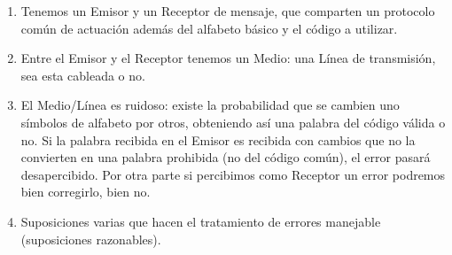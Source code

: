 \begin{enumerate}
\begin{enumerate}
    \begin{enumerate}
    \def\labelenumiii{\arabic{enumiii}.}
    \item
      Tenemos un Emisor y un Receptor de mensaje, que comparten un
      protocolo común de actuación además del alfabeto básico y el
      código a utilizar.
    \item
      Entre el Emisor y el Receptor tenemos un Medio: una Línea de
      transmisión, sea esta cableada o no.
    \item
      El Medio/Línea es ruidoso: existe la probabilidad que se cambien
      uno símbolos de alfabeto por otros, obteniendo así una palabra del
      código válida o no. Si la palabra re\-cibida en el Emisor es
      recibida con cambios que no la convierten en una palabra prohibida
      (no del código común), el error pasará desapercibido. Por otra
      parte si per\-cibimos como Receptor un error podremos bien
      corregirlo, bien no.
    \item
      Suposiciones varias que hacen el tratamiento de errores manejable
      (suposiciones ra\-zonables).


\end{enumerate}
\end{enumerate}
\end{enumerate}
